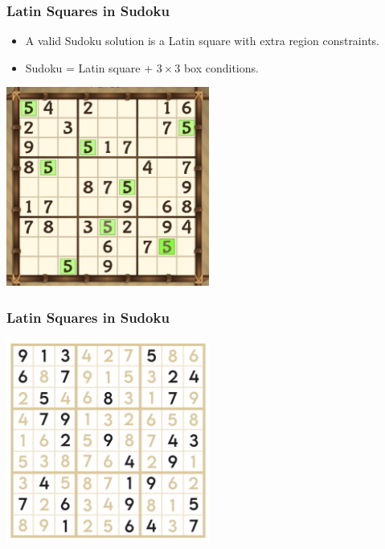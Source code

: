 \documentclass{beamer}
\begin{document}
\begin{frame}
\frametitle{Latin Squares in Sudoku}
\begin{itemize}
  \item A valid Sudoku solution is a Latin square with extra region constraints.
  \item Sudoku = Latin square + $3\times3$ box conditions.
\end{itemize}
\begin{center}
\includegraphics[width=0.5\textwidth]{img8}
\end{center}
\end{frame}

\begin{frame}
\frametitle{Latin Squares in Sudoku}
\begin{center}
\includegraphics[width=0.5\textwidth]{img9}
\end{center}
\end{frame}
\end{document}
